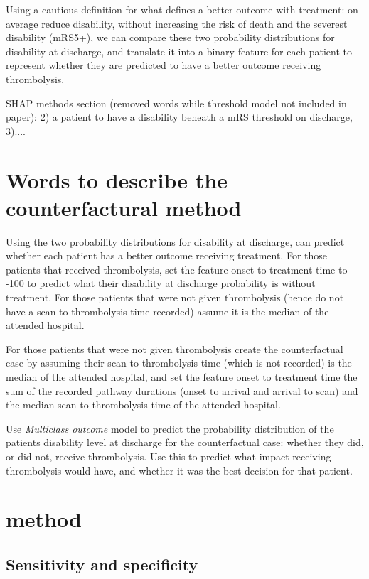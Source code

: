 Using a cautious definition for what defines a better outcome with treatment: on average reduce disability, without increasing the risk of death and the severest disability (mRS5+), we can compare these two probability distributions for disability at discharge, and translate it into a binary feature for each patient to represent whether they are predicted to have a better outcome receiving thrombolysis.



SHAP methods section (removed words while threshold model not included in paper):
    2) a patient to have a disability beneath a mRS threshold on discharge, 3)....



\section{Words to describe the counterfactural method}
Using the two probability distributions for disability at discharge, can predict whether each patient has a better outcome receiving treatment. For those patients that received thrombolysis, set the feature onset to treatment time to -100 to predict what their disability at discharge probability is without treatment. For those patients that were not given thrombolysis (hence do not have a scan to thrombolysis time recorded) assume it is the median of the attended hospital.

For those patients that were not given thrombolysis create the counterfactual case by assuming their scan to thrombolysis time (which is not recorded) is the median of the attended hospital, and set the feature onset to treatment time the sum of the recorded pathway durations (onset to arrival and arrival to scan) and the median scan to thrombolysis time of the attended hospital.

Use \textit{Multiclass outcome} model to predict the probability distribution of the patients disability level at discharge for the counterfactual case: whether they did, or did not, receive thrombolysis. Use this to predict what impact receiving thrombolysis would have, and whether it was the best decision for that patient.


\section{method}

\subsection{Sensitivity and specificity}


